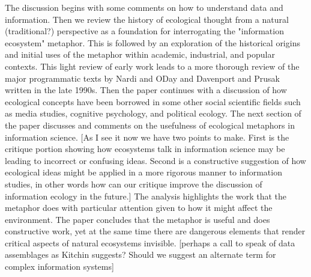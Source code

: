 The discussion begins with some comments on how to understand data and information. Then we review the history of ecological thought from a natural (traditional?) perspective as a foundation for interrogating the "information ecosystem" metaphor. This is followed by an exploration of the historical origins and initial uses of the metaphor within academic, industrial, and popular contexts. This light review of early work leads to a more thorough review of the major programmatic texts by Nardi and ODay and Davenport and Prusak written in the late 1990s. Then the paper continues with a discussion of how ecological concepts have been borrowed in some other social scientific fields such as media studies, cognitive psychology, and political ecology. The next section of the paper discusses and comments on the usefulness of ecological metaphors in information science. [As I see it now we have two points to make. First is the critique portion showing how ecosystems talk in information science may be leading to incorrect or confusing ideas. Second is a constructive suggestion of how ecological ideas might be applied in a more rigorous manner to information studies, in other words how can our critique improve the discussion of information ecology in the future.] The analysis highlights the work that the metaphor does with particular attention given to how it might affect the environment. The paper concludes that the metaphor is useful and does constructive work, yet at the same time there are dangerous elements that render critical aspects of natural ecosystems invisible. [perhaps a call to speak of data assemblages as Kitchin suggests? Should we suggest an alternate term for complex information systems]
